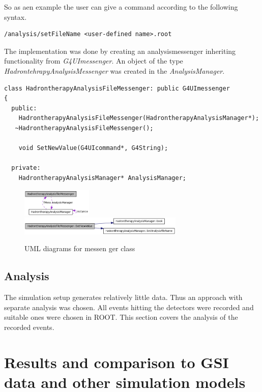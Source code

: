 So as aen example the user can give a command according to the following syntax.
\scriptsize
\begin{verbatim}
/analysis/setFileName <user-defined name>.root
\end{verbatim}
\normalsize

The implementation was done by creating an analysismessenger inheriting functionality from \textit{G4UImessenger}. An object of the type \textit{HadrontehrapyAnalysisMessenger} was created in the \textit{AnalysisManager}.


\scriptsize
\begin{verbatim}
class HadrontherapyAnalysisFileMessenger: public G4UImessenger
{
  public:
    HadrontherapyAnalysisFileMessenger(HadrontherapyAnalysisManager*);
   ~HadrontherapyAnalysisFileMessenger();
    
    void SetNewValue(G4UIcommand*, G4String);
    
  private:
    HadrontherapyAnalysisManager* AnalysisManager;
\end{verbatim}
\normalsize
\begin{figure}[h] 
\begin{center}
\includegraphics[width=0.3\textwidth]{images/setFileNameMessenger_1.png}  
\includegraphics[width=0.7\textwidth]{images/setFileNameMessenger_2.png}  
\caption{\label{fig:messengerUML} UML diagrams for messen ger class}
 
 \end{center}
 \end{figure}

\subsection{Analysis}
The simulation setup generates relatively little data. Thus an approach with separate analysis was chosen. All events hitting the detectors were recorded and suitable ones were chosen in ROOT. This section covers the analysis of the recorded events.

\section{Results and comparison to GSI data and other simulation models}

